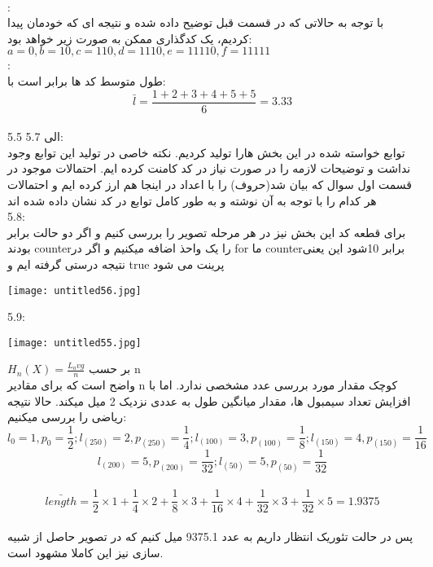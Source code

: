 \\[0.5cm]
:
\\
با توجه به حالاتی که در قسمت قبل توضیح داده شده و نتیجه ای که خودمان پیدا کردیم، یک کدگذاری ممکن به صورت زیر خواهد بود:
\\[0.3cm]
\centering
$a=0, b=10, c=110, d=1110, e=11110, f=11111$
\\[0.5cm]
:
\\
طول متوسط کد ها برابر است با:
\\[0.3cm]
\[
\bar{l} = \frac{1+2+3+4+5+5}{6} = 3.33
\]
\\[0.5cm]
5.5 الی 5.7:
\\
توابع خواسته شده در این بخش هارا تولید کردیم. نکته خاصی در تولید این توابع وجود نداشت و توضیحات لازمه را در صورت نیاز در کد کامنت کرده ایم.
احتمالات موجود در قسمت اول سوال که بیان شد(حروف) را با اعداد در اینجا هم ارز کرده ایم و احتمالات هر کدام را با توجه به آن نوشته و به طور کامل توابع در کد نشان داده شده اند
\\[0.5cm]
5.8:
\\
برای قطعه کد این بخش نیز در هر مرحله تصویر را بررسی کنیم و اگر دو حالت برابر بودند counterرا یک واحذ اضافه میکنیم و اگر در for ما counterبرابر 10شود این یعنی نتیجه درستی گرفته ایم و true پرینت می شود
\\

\begin{center}
    \texttt{[image: untitled56.jpg]}
\end{center}


5.9:
\\
\begin{center}
    \texttt{[image: untitled55.jpg]}
\end{center}

\centering

$H_n(X) = \frac{L_avg}{n} $ بر حسب n
\\
واضح است که برای مقادیر n کوچک مقدار مورد بررسی عدد مشخصی ندارد. اما با افزایش تعداد سیمبول ها، مقدار میانگین طول به عددی نزدیک 2 میل میکند. حالا نتیجه ریاضی را بررسی میکنیم:
\\
\[
l_0=1,p_0=\frac{1}{2};l_(250)=2,p_(250)=\frac{1}{4};l_(100)=3,p_(100)=\frac{1}{8};l_(150)=4,p_(150)=\frac{1}{16}
\]
\[
l_(200)=5,p_(200)=\frac{1}{32};l_(50)=5,p_(50)=\frac{1}{32}
\]
\\
\[
\bar{length}=\frac{1}{2}\times 1 + \frac{1}{4}\times 2 + \frac{1}{8}\times 3 + \frac{1}{16}\times 4 + \frac{1}{32}\times 3  + \frac{1}{32}\times 5 = 1.9375
\]
\raggedleft
\\
پس در حالت تئوریک انتظار داریم به عدد 9375.1 میل کنیم که در تصویر حاصل از شبیه سازی نیز این کاملا مشهود است.
